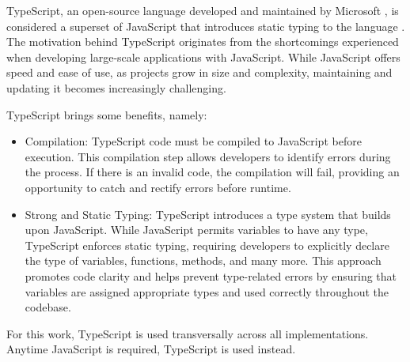 TypeScript, an open-source language developed and maintained by Microsoft
, is considered a superset of JavaScript that
introduces static typing to the language . The
motivation behind TypeScript originates from the shortcomings experienced when
developing large-scale applications with JavaScript. While JavaScript offers
speed and ease of use, as projects grow in size and complexity, maintaining and
updating it becomes increasingly challenging.

TypeScript brings some benefits, namely:

\begin{itemize}
  \item Compilation: TypeScript code must be compiled to JavaScript before
    execution. This compilation step allows developers to identify errors
    during the process. If there is an invalid code, the compilation will
    fail, providing an opportunity to catch and rectify errors before
    runtime.

  \item Strong and Static Typing: TypeScript introduces a type system that
    builds upon JavaScript. While JavaScript permits variables to have any
    type, TypeScript enforces static typing, requiring developers to
    explicitly declare the type of variables, functions, methods, and many
    more. This approach promotes code clarity and helps prevent type-related
    errors by ensuring that variables are assigned appropriate types and used
    correctly throughout the codebase.

\end{itemize}

For this work, TypeScript is used transversally across all implementations.
Anytime JavaScript is required, TypeScript is used instead.
